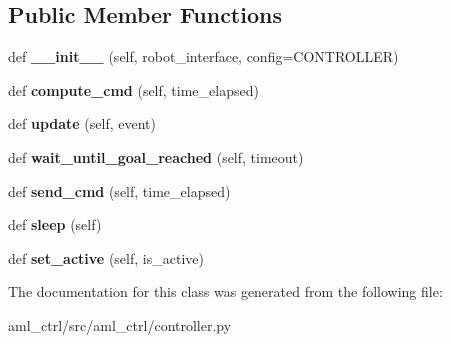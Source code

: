 \subsection*{Public Member Functions}
\begin{DoxyCompactItemize}
\item 
\hypertarget{classaml__ctrl_1_1controller_1_1_controller_afd51475115d5e8a1771b3c81feedaf3d}{}\label{classaml__ctrl_1_1controller_1_1_controller_afd51475115d5e8a1771b3c81feedaf3d} 
def {\bfseries \+\_\+\+\_\+init\+\_\+\+\_\+} (self, robot\+\_\+interface, config=C\+O\+N\+T\+R\+O\+L\+L\+ER)
\item 
\hypertarget{classaml__ctrl_1_1controller_1_1_controller_ac2f48b93dc632b1fbe3f8f4fa3145a37}{}\label{classaml__ctrl_1_1controller_1_1_controller_ac2f48b93dc632b1fbe3f8f4fa3145a37} 
def {\bfseries compute\+\_\+cmd} (self, time\+\_\+elapsed)
\item 
\hypertarget{classaml__ctrl_1_1controller_1_1_controller_a79483d53de64ddf93a54fb12fcf48c76}{}\label{classaml__ctrl_1_1controller_1_1_controller_a79483d53de64ddf93a54fb12fcf48c76} 
def {\bfseries update} (self, event)
\item 
\hypertarget{classaml__ctrl_1_1controller_1_1_controller_a9b032c903b1f7d124bcefc67204aacb5}{}\label{classaml__ctrl_1_1controller_1_1_controller_a9b032c903b1f7d124bcefc67204aacb5} 
def {\bfseries wait\+\_\+until\+\_\+goal\+\_\+reached} (self, timeout)
\item 
\hypertarget{classaml__ctrl_1_1controller_1_1_controller_ac31df87d3ed744e8d73003204be01762}{}\label{classaml__ctrl_1_1controller_1_1_controller_ac31df87d3ed744e8d73003204be01762} 
def {\bfseries send\+\_\+cmd} (self, time\+\_\+elapsed)
\item 
\hypertarget{classaml__ctrl_1_1controller_1_1_controller_a8fe34da706a2080c339a7c50d403e7f8}{}\label{classaml__ctrl_1_1controller_1_1_controller_a8fe34da706a2080c339a7c50d403e7f8} 
def {\bfseries sleep} (self)
\item 
\hypertarget{classaml__ctrl_1_1controller_1_1_controller_ae1d0b1f66806e87454e7f0aa2e36b78e}{}\label{classaml__ctrl_1_1controller_1_1_controller_ae1d0b1f66806e87454e7f0aa2e36b78e} 
def {\bfseries set\+\_\+active} (self, is\+\_\+active)
\end{DoxyCompactItemize}


The documentation for this class was generated from the following file\+:\begin{DoxyCompactItemize}
\item 
aml\+\_\+ctrl/src/aml\+\_\+ctrl/controller.\+py\end{DoxyCompactItemize}
